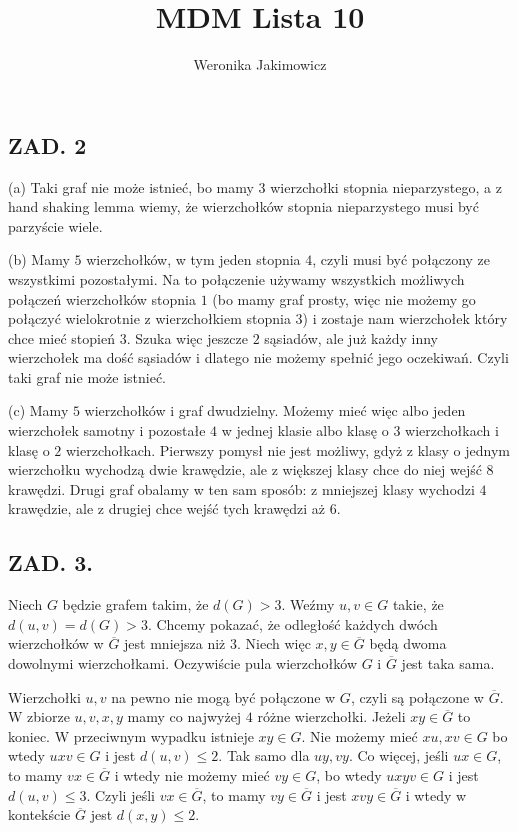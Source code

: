 \documentclass{article}
\author{Weronika Jakimowicz}
\title{MDM Lista 10}
\date{}
\begin{document}
\maketitle
\thispagestyle{empty}

\subsection*{ZAD. 2}

{\color{acc}(a)} Taki {graf} nie może istnieć, bo mamy 3 wierzchołki stopnia nieparzystego, a z hand shaking lemma wiemy, że wierzchołków stopnia nieparzystego musi być parzyście wiele.
\medskip

{\color{acc}(b)} Mamy $5$ wierzchołków, w tym jeden stopnia $4$, czyli musi być połączony ze wszystkimi pozostałymi. Na to połączenie używamy wszystkich możliwych połączeń wierzchołków stopnia $1$ (bo mamy graf prosty, więc nie możemy go połączyć wielokrotnie z wierzchołkiem stopnia $3$) i zostaje nam wierzchołek który chce mieć stopień $3$. Szuka więc jeszcze $2$ sąsiadów, ale już każdy inny wierzchołek ma dość sąsiadów i dlatego nie możemy spełnić jego oczekiwań. Czyli taki graf nie może istnieć.
\medskip

{\color{acc}(c)} Mamy $5$ wierzchołków i graf dwudzielny. Możemy mieć więc albo jeden wierzchołek samotny i pozostałe $4$ w jednej klasie albo klasę o $3$ wierzchołkach i klasę o $2$ wierzchołkach. Pierwszy pomysł nie jest możliwy, gdyż z klasy o jednym wierzchołku wychodzą dwie krawędzie, ale z większej klasy chce do niej wejść $8$ krawędzi. Drugi graf obalamy w ten sam sposób: z mniejszej klasy wychodzi $4$ krawędzie, ale z drugiej chce wejść tych krawędzi aż $6$.

\subsection*{ZAD. 3.}

Niech $G$ będzie grafem takim, że $d(G)>3$. Weźmy $u,v\in G$ takie, że $d(u, v)=d(G)>3$. Chcemy pokazać, że odległość każdych dwóch wierzchołków w $\overline G$ jest mniejsza niż $3$. Niech więc $x,y\in \overline G$ będą dwoma dowolnymi wierzchołkami. Oczywiście pula wierzchołków $G$ i $\overline G$ jest taka sama.

Wierzchołki $u,v$ na pewno nie mogą być połączone w $G$, czyli są połączone w $\overline G$. W zbiorze $u,v,x,y$ mamy co najwyżej $4$ różne wierzchołki. Jeżeli $xy\in \overline G$ to koniec. W przeciwnym wypadku istnieje $xy\in G$. Nie możemy mieć $xu,xv\in G$ bo wtedy $uxv\in G$ i jest $d(u,v)\leq2$. Tak samo dla $uy,vy$. Co więcej, jeśli $ux\in G$, to mamy $vx\in\overline G$ i wtedy nie możemy mieć $vy\in G$, bo wtedy $uxyv\in G$ i jest $d(u,v)\leq 3$. Czyli jeśli $vx\in\overline G$, to mamy $vy\in\overline G$ i jest $xvy\in\overline G$ i wtedy w kontekście $\overline G$ jest $d(x,y)\leq 2$.
\end{document}

